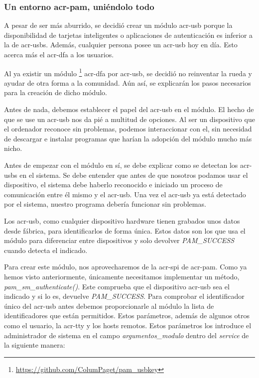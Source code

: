 \documentclass[titlepage, 12pt, a4paper]{article}
\begin{document}
{\subsubsection{Un entorno \gls{acr-pam}, uniéndolo todo}
A pesar de ser más aburrido, se decidió crear un módulo \gls{acr-usb} porque la disponibilidad de tarjetas inteligentes o aplicaciones de autenticación es inferior a la de \gls{acr-usb}s. Además, cualquier persona posee un \gls{acr-usb} hoy en día. Esto acerca más el \gls{acr-dfa} a los usuarios. \par
Al ya existir un módulo \footnote{\url{https://github.com/ColumPaget/pam_usbkey}} \gls{acr-dfa} por \gls{acr-usb}, se decidió no reinventar la rueda y ayudar de otra forma a la comunidad. Aún así, se explicarán los pasos necesarios para la creación de dicho módulo. \par
Antes de nada, debemos establecer el papel del \gls{acr-usb} en el módulo. El hecho de que se use un \gls{acr-usb} nos da pié a multitud de opciones. Al ser un dispositivo que el ordenador reconoce sin problemas, podemos interaccionar con el, sin necesidad de descargar e instalar programas que harían la adopción del módulo mucho más nicho.\par
Antes de empezar con el módulo en sí, se debe explicar como se detectan los \gls{acr-usb}s en el sistema. Se debe entender que antes de que nosotros podamos usar el dispositivo, el sistema debe haberlo reconocido e iniciado un proceso de comunicación entre él mismo y el \gls{acr-usb}. Una vez el \gls{acr-usb} ya está detectado por el sistema, nuestro programa debería funcionar sin problemas.\par
Los \gls{acr-usb}, como cualquier dispositivo hardware tienen grabados unos datos desde fábrica, para identificarlos de forma única. Estos datos son los que usa el módulo para diferenciar entre dispositivos y solo devolver \textit{PAM\_SUCCESS} cuando detecta el indicado.\par
Para crear este módulo, nos aprovecharemos de la \gls{acr-spi} de \gls{acr-pam}. Como ya hemos visto anteriormente, únicamente necesitamos implementar un método, \textit{pam\_sm\_authenticate()}. Este comprueba que el dispositivo \gls{acr-usb} sea el indicado y si lo es, devuelve \textit{PAM\_SUCCESS}. 
Para comprobar el identificador único del \gls{acr-usb} antes debemos proporcionarle al módulo la lista de identificadores que están permitidos. Estos parámetros, además de algunos otros como el usuario, la \gls{acr-tty} y los hosts remotos. Estos parámetros los introduce el administrador de sistema en el campo \textit{argumentos\_modulo} dentro del \textit{service} de la siguiente manera:
}
\end{document}
